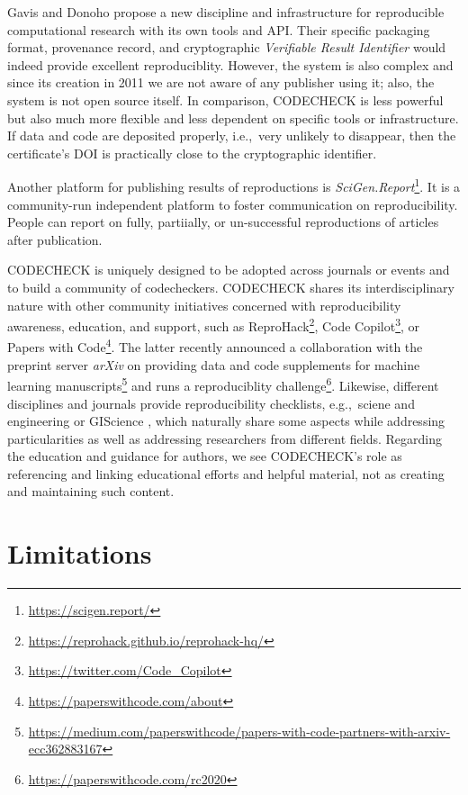\documentclass[12pt]{article}
\begin{document}
Gavis and Donoho \cite{gavish_universal_2011} propose a new discipline
and infrastructure for reproducible computational research with its
own tools and API. Their specific packaging format, provenance record,
and cryptographic \emph{Verifiable Result Identifier} would indeed
provide excellent reproduciblity. However, the system is also complex
and since its creation in 2011 we are not aware of any publisher using
it; also, the system is not open source itself.  In comparison,
CODECHECK is less powerful but also much more flexible and less
dependent on specific tools or infrastructure. If data and code are
deposited properly, i.e.,~very unlikely to disappear, then the
certificate's DOI is practically close to the cryptographic
identifier.

Another platform for publishing results of reproductions is
\emph{SciGen.Report}\footnote{\url{https://scigen.report/}}.  It is a
community-run independent platform to foster communication on
reproducibility.  People can report on fully, partiially, or
un-successful reproductions of articles after publication.

CODECHECK is uniquely designed to be adopted across journals or events
and to build a community of codecheckers. CODECHECK shares its
interdisciplinary nature with other community initiatives concerned
with reproducibility awareness, education, and support, such as
ReproHack\footnote{\url{https://reprohack.github.io/reprohack-hq/}},
Code Copilot\footnote{\url{https://twitter.com/Code_Copilot}}, or
Papers with Code\footnote{\url{https://paperswithcode.com/about}}.
The latter recently announced a collaboration with the preprint server
\emph{arXiv} on providing data and code supplements for machine
learning
manuscripts\footnote{\url{https://medium.com/paperswithcode/papers-with-code-partners-with-arxiv-ecc362883167}}
and runs a reproduciblity
challenge\footnote{\url{https://paperswithcode.com/rc2020}}.
Likewise, different disciplines and journals provide reproducibility
checklists, e.g.,~sciene and engineering \cite{rosenberg_next_2020} or
GIScience \cite{nust_agile_2019}, which naturally share some aspects
while addressing particularities as well as addressing researchers
from different fields. Regarding the education and guidance for
authors, we see CODECHECK's role as referencing and linking
educational efforts and helpful material, not as creating and
maintaining such content.

\section*{Limitations}\label{limitations}
\end{document}
